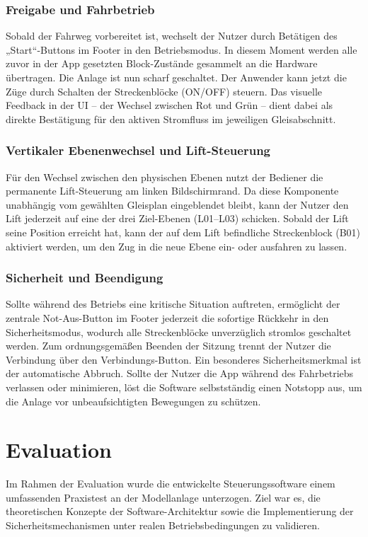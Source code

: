 \documentclass{article}
\begin{document}
\subsubsection{Freigabe und Fahrbetrieb}
Sobald der Fahrweg vorbereitet ist, wechselt der Nutzer durch Betätigen des „Start“-Buttons im Footer in den Betriebsmodus.
In diesem Moment werden alle zuvor in der App gesetzten Block-Zustände gesammelt an die Hardware übertragen.
Die Anlage ist nun scharf geschaltet.
Der Anwender kann jetzt die Züge durch Schalten der Streckenblöcke (ON/OFF) steuern.
Das visuelle Feedback in der UI – der Wechsel zwischen Rot und Grün – dient dabei als direkte Bestätigung für den aktiven Stromfluss im jeweiligen Gleisabschnitt.

\subsubsection{Vertikaler Ebenenwechsel und Lift-Steuerung}
Für den Wechsel zwischen den physischen Ebenen nutzt der Bediener die permanente Lift-Steuerung am linken Bildschirmrand.
Da diese Komponente unabhängig vom gewählten Gleisplan eingeblendet bleibt, kann der Nutzer den Lift jederzeit auf eine der drei Ziel-Ebenen (L01–L03) schicken.
Sobald der Lift seine Position erreicht hat, kann der auf dem Lift befindliche Streckenblock (B01) aktiviert werden, um den Zug in die neue Ebene ein- oder ausfahren zu lassen.

\subsubsection{Sicherheit und Beendigung}
Sollte während des Betriebs eine kritische Situation auftreten, ermöglicht der zentrale Not-Aus-Button im Footer jederzeit die sofortige Rückkehr in den Sicherheitsmodus, wodurch alle Streckenblöcke unverzüglich stromlos geschaltet werden.
Zum ordnungsgemäßen Beenden der Sitzung trennt der Nutzer die Verbindung über den Verbindungs-Button.
Ein besonderes Sicherheitsmerkmal ist der automatische Abbruch.
Sollte der Nutzer die App während des Fahrbetriebs verlassen oder minimieren, löst die Software selbstständig einen Notstopp aus, um die Anlage vor unbeaufsichtigten Bewegungen zu schützen.


\section{Evaluation}
Im Rahmen der Evaluation wurde die entwickelte Steuerungssoftware einem umfassenden Praxistest an der Modellanlage unterzogen.
Ziel war es, die theoretischen Konzepte der Software-Architektur sowie die Implementierung der Sicherheitsmechanismen unter realen Betriebsbedingungen zu validieren.
\end{document}
